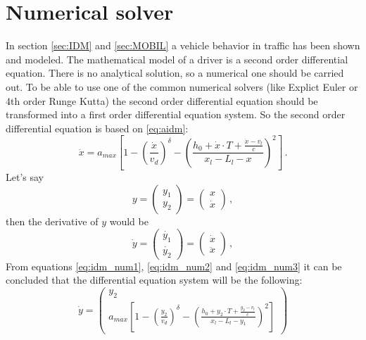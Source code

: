 \documentclass[a4paper,11pt,twoside]{report}
\begin{document}
		\section{Numerical solver}
			In section \ref{sec:IDM} and \ref{sec:MOBIL} a vehicle behavior in traffic has been shown and modeled. The mathematical model of a driver is a second order differential equation. There is no analytical solution, so a numerical one should be carried out. To be able to use one of the common numerical solvers (like Explict Euler or 4th order Runge Kutta) the second order differential equation should be transformed into a first order differential equation system. So the second order differential equation is based on \ref{eq:aidm}:
			\begin{equation}
				\ddot{x}=a_{max}\left [ 1 - \left ( \frac{\dot{x}}{v_d} \right )^\delta - \left ( \frac{h_0 + \dot{x}\cdot T + \frac{\dot{x}-v_l}{c}}{x_l-L_l - x} \right )^2 \right ]\,.
				\label{eq:idm_num1}
			\end{equation}
			Let's say
			\begin{equation}
				y=
				\begin{pmatrix}
					y_1\\
					y_2
				\end{pmatrix}
				=
				\begin{pmatrix}
					x\\
					\dot{x}
				\end{pmatrix}\,,
				\label{eq:idm_num2}
			\end{equation}
			then the derivative of $y$ would be
			\begin{equation}
				\dot{y}=
				\begin{pmatrix}
					\dot{y_1}\\
					\dot{y_2}
				\end{pmatrix}
				=
				\begin{pmatrix}
					\dot{x}\\
					\ddot{x}
				\end{pmatrix}\,,
				\label{eq:idm_num3}
			\end{equation}
			From equations \ref{eq:idm_num1}, \ref{eq:idm_num2} and \ref{eq:idm_num3} it can be concluded that the differential equation system will be the following:
			\begin{equation}
				\dot{y}=
				\begin{pmatrix}
					y_2\\
					a_{max}\left [ 1 - \left ( \frac{y_2}{v_d} \right )^\delta - \left ( \frac{h_0 + y_2\cdot T + \frac{y_2-v_l}{c}}{x_l-L_l - y_1} \right )^2 \right ]
				\end{pmatrix}
				\label{eq:numerical_idm}
			\end{equation}
\end{document}
